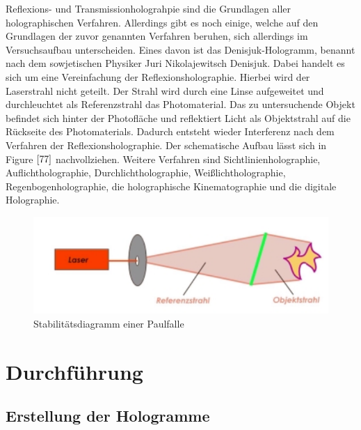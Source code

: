 \documentclass[12pt,a4paper]{article}
\begin{document}
Reflexions- und Transmissionholograhpie sind die Grundlagen aller holographischen Verfahren. Allerdings gibt es noch einige, welche auf den Grundlagen der zuvor genannten Verfahren beruhen, sich allerdings im Versuchsaufbau unterscheiden. Eines davon ist das Denisjuk-Hologramm, benannt nach dem sowjetischen Physiker Juri Nikolajewitsch Denisjuk. Dabei handelt es sich um eine Vereinfachung der Reflexionsholographie. Hierbei wird der Laserstrahl nicht geteilt. Der Strahl wird durch eine Linse aufgeweitet und durchleuchtet als Referenzstrahl das Photomaterial. Das zu untersuchende Objekt befindet sich hinter der Photofläche und reflektiert Licht als Objektstrahl auf die Rückseite des Photomaterials. Dadurch entsteht wieder Interferenz nach dem Verfahren der Reflexionsholographie. Der schematische Aufbau lässt sich in Figure $\ref{77}$ nachvollziehen. Weitere Verfahren sind Sichtlinienholographie, Auflichtholographie, Durchlichtholographie, Weißlichtholographie,  Regenbogenholographie, die holographische Kinematographie und die digitale Holographie. 

\begin{figure}[h]
	\includegraphics[scale = 0.5]{denis.png}
	\centering
	\caption{Stabilitätsdiagramm einer Paulfalle}
	\label{77}
\end{figure}

\section{Durchführung}


\subsection{Erstellung der Hologramme}
\end{document}
